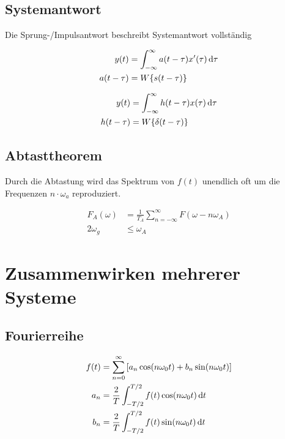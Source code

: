 \documentclass[10pt,a4paper]{article}
\begin{document}
  \subsection{Systemantwort}
  Die Sprung-/Impulsantwort beschreibt Systemantwort vollständig
  \begin{mdframed}[style=exercise]
    \begin{align}
      y(t) &= \int^{\infty}_{-\infty} a(t-\tau) x'(\tau) \dd{\tau}\\
      a(t-\tau) &= W\qty{s(t-\tau)}\nonumber
    \end{align}
  \end{mdframed}
  \begin{mdframed}[style=exercise]
    \begin{align}
      y(t) &= \int_{-\infty}^{\infty} h(t-\tau) x(\tau) \dd{\tau}\\
      h(t-\tau) &= W\qty{\delta(t-\tau)}\nonumber
    \end{align}
  \end{mdframed}
  \subsection{Abtasttheorem}
  Durch die Abtastung wird das Spektrum von $f(t)$ unendlich oft um die Frequenzen $n\cdot \omega_a$ reproduziert.
  \begin{mdframed}[style=exercise]
    \begin{align}
      F_A(\omega) &= \frac{1}{T_A} \sum_{n=-\infty}^{\infty} F(\omega-n\omega_A)\\
      2\omega_g &\leq \omega_A\nonumber
    \end{align}
  \end{mdframed}
  \section{Zusammenwirken mehrerer Systeme}
  \subsection{Fourierreihe}
  \begin{mdframed}[style=exercise]
    \begin{align}
      f(t) &= \sum_{n=0}^{\infty} \qty[a_n \cos(n \omega_0 t) + b_n \sin(n \omega_0 t)]\\
      a_n &= \frac{2}{T}\int_{-T/2}^{T/2}f(t)\cos(n\omega_0 t)\dd{t}\nonumber\\
      b_n &= \frac{2}{T}\int_{-T/2}^{T/2}f(t)\sin(n\omega_0 t)\dd{t}\nonumber
    \end{align}
  \end{mdframed}
  \pagebreak
\end{document}
